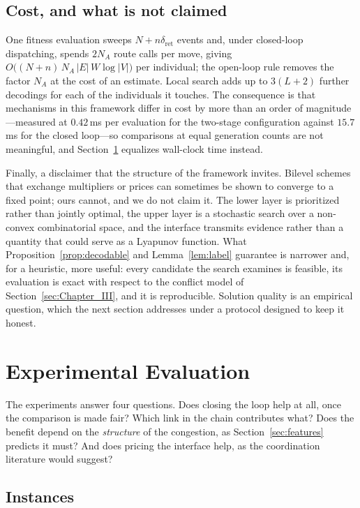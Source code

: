 \documentclass[manuscript,screen,review]{acmart}
\begin{document}
\subsection{Cost, and what is not claimed}

One fitness evaluation sweeps $N+n\delta_{\mathrm{ret}}$ events and, under
closed-loop dispatching, spends $2N_A$ route calls per move, giving
$O\bigl((N+n)\,N_A\,|E|\,W\log|V|\bigr)$ per individual; the open-loop rule
removes the factor $N_A$ at the cost of an estimate. Local search adds up to
$3(L+2)$ further decodings for each of the individuals it touches. The
consequence is that mechanisms in this framework differ in cost by more than an
order of magnitude---measured at $0.42$\,ms per evaluation for the two-stage
configuration against $15.7$\,ms for the closed loop---so comparisons at equal
generation counts are not meaningful, and Section~\ref{sec:Chapter_V} equalizes
wall-clock time instead.

Finally, a disclaimer that the structure of the framework invites. Bilevel
schemes that exchange multipliers or prices can sometimes be shown to converge
to a fixed point; ours cannot, and we do not claim it. The lower layer is
prioritized rather than jointly optimal, the upper layer is a stochastic search
over a non-convex combinatorial space, and the interface transmits evidence
rather than a quantity that could serve as a Lyapunov function. What
Proposition~\ref{prop:decodable} and Lemma~\ref{lem:label} guarantee is
narrower and, for a heuristic, more useful: every candidate the search examines
is feasible, its evaluation is exact with respect to the conflict model of
Section~\ref{sec:Chapter_III}, and it is reproducible. Solution quality is an
empirical question, which the next section addresses under a protocol designed
to keep it honest.

\section{Experimental Evaluation}
\label{sec:Chapter_V}

The experiments answer four questions. Does closing the loop help at all, once
the comparison is made fair? Which link in the chain contributes what? Does the
benefit depend on the \emph{structure} of the congestion, as
Section~\ref{sec:features} predicts it must? And does pricing the interface
help, as the coordination literature would suggest?

\subsection{Instances}
\label{sec:instances}
\end{document}

